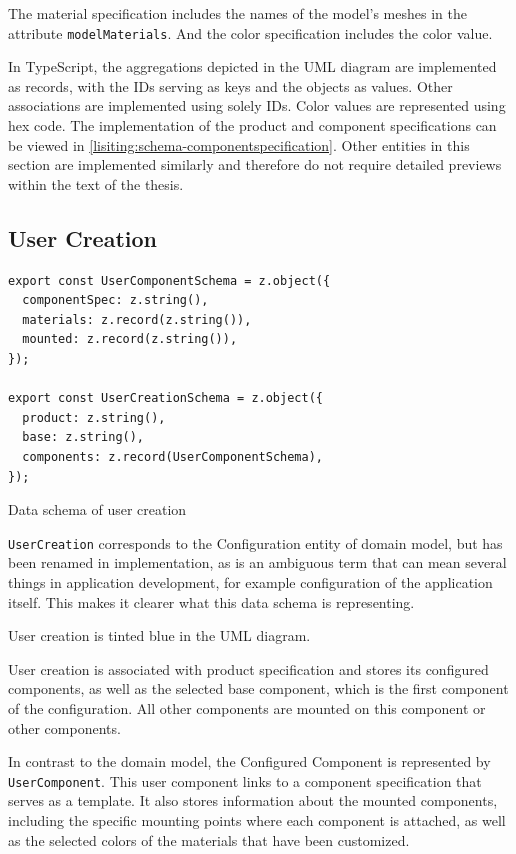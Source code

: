 The material specification includes the names of the model's meshes in the attribute \texttt{modelMaterials}. And the color specification includes the color value.

In TypeScript, the aggregations depicted in the UML diagram are implemented as records, with the IDs serving as keys and the objects as values. Other associations are implemented using solely IDs. Color values are represented using hex code. The implementation of the product and component specifications can be viewed in \autoref{lisiting:schema-componentspecification}. Other entities in this section are implemented similarly and therefore do not require detailed previews within the text of the thesis.


\subsection{User Creation}

\begin{listing}[h]
\begin{verbatim}
export const UserComponentSchema = z.object({
  componentSpec: z.string(),
  materials: z.record(z.string()),
  mounted: z.record(z.string()),
});

export const UserCreationSchema = z.object({
  product: z.string(),
  base: z.string(),
  components: z.record(UserComponentSchema),
});
\end{verbatim}
\caption{Data schema of user creation}
\label{lisiting:schema-usercreation}
\end{listing}

\texttt{UserCreation} corresponds to the Configuration entity of domain model, but has been renamed in implementation, as  is an ambiguous term that can mean several things in application development, for example configuration of the application itself. This makes it clearer what this data schema is representing.

User creation is tinted blue in the UML diagram.

User creation is associated with product specification and stores its configured components, as well as the selected base component, which is the first component of the configuration. All other components are mounted on this component or other components.

In contrast to the domain model, the Configured Component is represented by \texttt{UserComponent}. This user component links to a component specification that serves as a template. It also stores information about the mounted components, including the specific mounting points where each component is attached, as well as the selected colors of the materials that have been customized.

